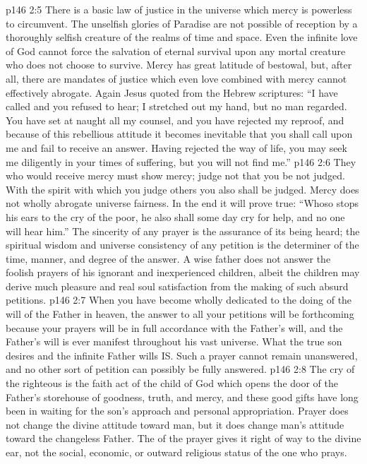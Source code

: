 \vs p146 2:5 \pc {}\bibnobreakspace There is a basic law of justice in the universe which mercy is powerless to circumvent. The unselfish glories of Paradise are not possible of reception by a thoroughly selfish creature of the realms of time and space. Even the infinite love of God cannot force the salvation of eternal survival upon any mortal creature who does not choose to survive. Mercy has great latitude of bestowal, but, after all, there are mandates of justice which even love combined with mercy cannot effectively abrogate. Again Jesus quoted from the Hebrew scriptures: \textcolor{ubdarkred}{“I have called and you refused to hear; I stretched out my hand, but no man regarded. You have set at naught all my counsel, and you have rejected my reproof, and because of this rebellious attitude it becomes inevitable that you shall call upon me and fail to receive an answer. Having rejected the way of life, you may seek me diligently in your times of suffering, but you will not find me.”}
\vs p146 2:6 \pc {}\bibnobreakspace They who would receive mercy must show mercy; judge not that you be not judged. With the spirit with which you judge others you also shall be judged. Mercy does not wholly abrogate universe fairness. In the end it will prove true: “Whoso stops his ears to the cry of the poor, he also shall some day cry for help, and no one will hear him.” The sincerity of any prayer is the assurance of its being heard; the spiritual wisdom and universe consistency of any petition is the determiner of the time, manner, and degree of the answer. A wise father does not  answer the foolish prayers of his ignorant and inexperienced children, albeit the children may derive much pleasure and real soul satisfaction from the making of such absurd petitions.
\vs p146 2:7 \pc {}\bibnobreakspace When you have become wholly dedicated to the doing of the will of the Father in heaven, the answer to all your petitions will be forthcoming because your prayers will be in full accordance with the Father’s will, and the Father’s will is ever manifest throughout his vast universe. What the true son desires and the infinite Father wills IS. Such a prayer cannot remain unanswered, and no other sort of petition can possibly be fully answered.
\vs p146 2:8 \pc {}\bibnobreakspace The cry of the righteous is the faith act of the child of God which opens the door of the Father’s storehouse of goodness, truth, and mercy, and these good gifts have long been in waiting for the son’s approach and personal appropriation. Prayer does not change the divine attitude toward man, but it does change man’s attitude toward the changeless Father. The  of the prayer gives it right of way to the divine ear, not the social, economic, or outward religious status of the one who prays.
